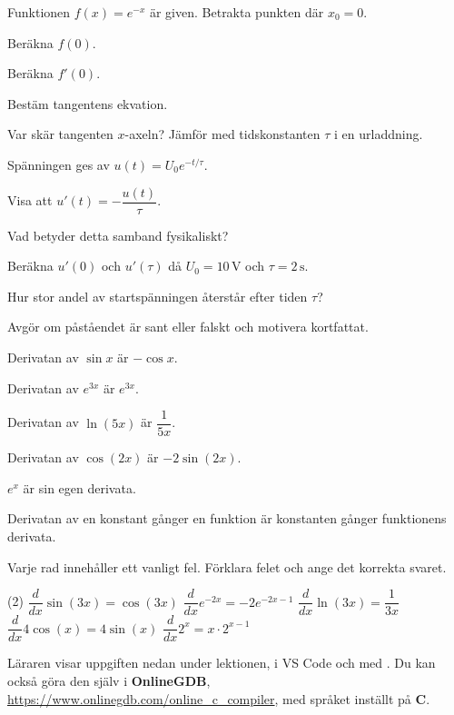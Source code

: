 Funktionen $f(x) = e^{-x}$ är given. Betrakta punkten där $x_0 = 0$.
\begin{parts}
  \item Beräkna $f(0)$.
  \item Beräkna $f'(0)$.
  \item Bestäm tangentens ekvation.
  \item Var skär tangenten $x$-axeln? Jämför med tidskonstanten $\tau$ i en urladdning.
\end{parts}

Spänningen ges av $u(t) = U_0e^{-t/\tau}$.
\begin{parts}
  \item Visa att $u'(t) = -\dfrac{u(t)}{\tau}$.
  \item Vad betyder detta samband fysikaliskt?
  \item Beräkna $u'(0)$ och $u'(\tau)$ då $U_0 = 10\,\text{V}$ och $\tau = 2\,\text{s}$.
  \item Hur stor andel av startspänningen återstår efter tiden $\tau$?
\end{parts}

Avgör om påståendet är sant eller falskt och motivera kortfattat.
\begin{parts}
  \item Derivatan av $\sin x$ är $-\cos x$.
  \item Derivatan av $e^{3x}$ är $e^{3x}$.
  \item Derivatan av $\ln(5x)$ är $\dfrac{1}{5x}$.
  \item Derivatan av $\cos(2x)$ är $-2\sin(2x)$.
  \item $e^x$ är sin egen derivata.
  \item Derivatan av en konstant gånger en funktion är konstanten gånger funktionens derivata.
\end{parts}

Varje rad innehåller ett vanligt fel. Förklara felet och ange det korrekta svaret.
\begin{delar}(2)
  \task $\dfrac{d}{dx}\sin(3x) = \cos(3x)$
  \task $\dfrac{d}{dx}e^{-2x} = -2e^{-2x-1}$
  \task $\dfrac{d}{dx}\ln(3x) = \dfrac{1}{3x}$
  \task $\dfrac{d}{dx}4\cos(x) = 4\sin(x)$
  \task $\dfrac{d}{dx}2^x = x \cdot 2^{x-1}$
\end{delar}

Läraren visar uppgiften nedan under lektionen, i VS Code och med . Du kan också göra den
själv i \textbf{OnlineGDB}, \url{https://www.onlinegdb.com/online_c_compiler}, med språket inställt
på \textbf{C}.


